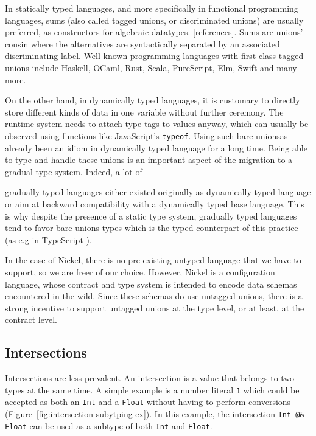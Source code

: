\documentclass[sigplan,10pt,review,anonymous]{acmart}
\newcommand{\unsure}[2][1=]{}
\newcommand{\resolved}[2]{}
\newcommand{\nickel}[1]{\lstinline[language=nickel]{#1}}
\begin{document}
In statically typed languages, and more specifically in functional programming
languages, sums (also called tagged unions, or discriminated unions) are usually
preferred, as constructors for algebraic datatypes. [references]. Sums are unions' cousin where the alternatives are
syntactically separated by an associated discriminating label. Well-known
programming languages with first-class tagged unions include Haskell, OCaml,
Rust, Scala, PureScript, Elm, Swift and many more.

On the other hand, in dynamically typed languages, it is customary to directly
store different kinds of data in one variable without further ceremony. The
runtime system needs to attach type tags to values anyway, which can usually be
observed using functions like JavaScript's \verb+typeof+. Using such bare
unions\resolved{If you can observe with typeof, then it's pretty much a tagged
union, though the tag is implicit} has already been an idiom in dynamically
typed language for a long time. Being able to type and handle these unions is an
important aspect of the migration to a gradual type system. Indeed, a lot of
\unsure{This is the first time discussing gradual type systems, maybe it should
be introduced earlier, in particular how they relate to contracts
(I think is mentioned on the appendix)}
gradually typed languages either existed originally as dynamically typed
language or aim at backward compatibility with a dynamically typed base
language. This is why despite the presence of a static type system, gradually
typed languages tend to favor bare unions types which is the typed counterpart
of this practice (as e.g in TypeScript \cite{TypeScriptUnions}).

In the case of Nickel, there is no pre-existing untyped language that we have to
support, so we are freer of our choice. However, Nickel is a configuration
language, whose contract and type system is intended to encode data schemas encountered in the wild. Since these schemas do use
untagged unions, there is a strong incentive to support untagged unions at the
type level, or at least, at the contract level.

\subsection*{Intersections}

Intersections are less prevalent. An intersection is a value that belongs to
two types at the same time. A simple example is a number literal \nickel{1}
which could be accepted as both an \nickel{Int} and a \nickel{Float} without
having to perform conversions (Figure~\ref{fig:intersection-subytping-ex}). In
this example, the intersection \nickel{Int @& Float} can be used as a subtype of
both \nickel{Int} and \nickel{Float}.
\end{document}
